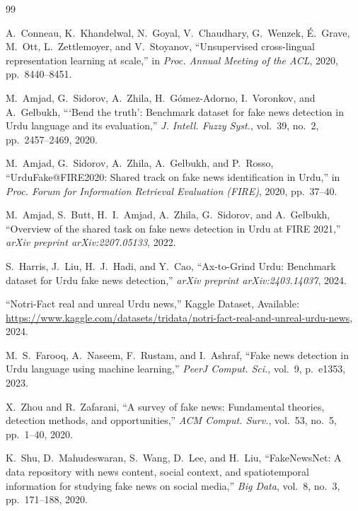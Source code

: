 \documentclass[conference]{IEEEtran}
\begin{document}

\begin{thebibliography}{99}

A.~Conneau, K.~Khandelwal, N.~Goyal, V.~Chaudhary, G.~Wenzek,
\'E.~Grave, M.~Ott, L.~Zettlemoyer, and V.~Stoyanov,
``Unsupervised cross-lingual representation learning at scale,''
in \textit{Proc. Annual Meeting of the ACL}, 2020, pp.~8440--8451.

M.~Amjad, G.~Sidorov, A.~Zhila, H.~G{\'o}mez-Adorno, I.~Voronkov, and
A.~Gelbukh,
```Bend the truth': Benchmark dataset for fake news detection in Urdu language
and its evaluation,''
\textit{J. Intell. Fuzzy Syst.}, vol.~39, no.~2, pp.~2457--2469, 2020.

M.~Amjad, G.~Sidorov, A.~Zhila, A.~Gelbukh, and P.~Rosso,
``UrduFake@FIRE2020: Shared track on fake news identification in Urdu,''
in \textit{Proc. Forum for Information Retrieval Evaluation (FIRE)}, 2020,
pp.~37--40.

M.~Amjad, S.~Butt, H.~I.~Amjad, A.~Zhila, G.~Sidorov, and A.~Gelbukh,
``Overview of the shared task on fake news detection in Urdu at FIRE 2021,''
\textit{arXiv preprint arXiv:2207.05133}, 2022.

S.~Harris, J.~Liu, H.~J.~Hadi, and Y.~Cao,
``Ax-to-Grind Urdu: Benchmark dataset for Urdu fake news detection,''
\textit{arXiv preprint arXiv:2403.14037}, 2024.

``Notri-Fact real and unreal Urdu news,''
Kaggle Dataset,
Available: \url{https://www.kaggle.com/datasets/tridata/notri-fact-real-and-unreal-urdu-news},
2024.

M.~S.~Farooq, A.~Naseem, F.~Rustam, and I.~Ashraf,
``Fake news detection in Urdu language using machine learning,''
\textit{PeerJ Comput. Sci.}, vol.~9, p.~e1353, 2023.

X.~Zhou and R.~Zafarani,
``A survey of fake news: Fundamental theories, detection methods, and
opportunities,''
\textit{ACM Comput. Surv.}, vol.~53, no.~5, pp.~1--40, 2020.

K.~Shu, D.~Mahudeswaran, S.~Wang, D.~Lee, and H.~Liu,
``FakeNewsNet: A data repository with news content, social context, and
spatiotemporal information for studying fake news on social media,''
\textit{Big Data}, vol.~8, no.~3, pp.~171--188, 2020.


\end{thebibliography}
\end{document}
